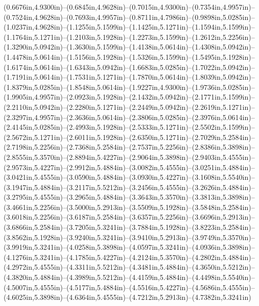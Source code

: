 (0.6676in,4.9300in)--(0.6845in,4.9628in)--(0.7015in,4.9300in)--(0.7354in,4.9957in)--(0.7524in,4.9628in)--(0.7693in,4.9957in)--(0.8711in,4.7986in)--(0.9898in,5.0285in)--(1.0237in,4.9628in)--(1.1255in,5.1599in)--(1.1425in,5.1271in)--(1.1594in,5.1599in)--(1.1764in,5.1271in)--(1.2103in,5.1928in)--(1.2273in,5.1599in)--(1.2612in,5.2256in)--(1.3290in,5.0942in)--(1.3630in,5.1599in)--(1.4138in,5.0614in)--(1.4308in,5.0942in)--(1.4478in,5.0614in)--(1.5156in,5.1928in)--(1.5326in,5.1599in)--(1.5495in,5.1928in)--(1.6174in,5.0614in)--(1.6343in,5.0942in)--(1.6683in,5.0285in)--(1.7022in,5.0942in)--(1.7191in,5.0614in)--(1.7531in,5.1271in)--(1.7870in,5.0614in)--(1.8039in,5.0942in)--(1.8379in,5.0285in)--(1.8548in,5.0614in)--(1.9227in,4.9300in)--(1.9736in,5.0285in)--(1.9905in,4.9957in)--(2.0923in,5.1928in)--(2.1432in,5.0942in)--(2.1771in,5.1599in)--(2.2110in,5.0942in)--(2.2280in,5.1271in)--(2.2449in,5.0942in)--(2.2619in,5.1271in)--(2.3297in,4.9957in)--(2.3636in,5.0614in)--(2.3806in,5.0285in)--(2.3976in,5.0614in)--(2.4145in,5.0285in)--(2.4993in,5.1928in)--(2.5333in,5.1271in)--(2.5502in,5.1599in)--(2.5672in,5.1271in)--(2.6011in,5.1928in)--(2.6350in,5.1271in)--(2.7029in,5.2584in)--(2.7198in,5.2256in)--(2.7368in,5.2584in)--(2.7537in,5.2256in)--(2.8386in,5.3898in)--(2.8555in,5.3570in)--(2.8894in,5.4227in)--(2.9064in,5.3898in)--(2.9403in,5.4555in)--(2.9573in,5.4227in)--(2.9912in,5.4884in)--(3.0082in,5.4555in)--(3.0251in,5.4884in)--(3.0421in,5.4555in)--(3.0590in,5.4884in)--(3.0930in,5.4227in)--(3.1608in,5.5540in)--(3.1947in,5.4884in)--(3.2117in,5.5212in)--(3.2456in,5.4555in)--(3.2626in,5.4884in)--(3.2795in,5.4555in)--(3.2965in,5.4884in)--(3.3643in,5.3570in)--(3.3813in,5.3898in)--(3.4661in,5.2256in)--(3.5000in,5.2913in)--(3.5509in,5.1928in)--(3.5848in,5.2584in)--(3.6018in,5.2256in)--(3.6187in,5.2584in)--(3.6357in,5.2256in)--(3.6696in,5.2913in)--(3.6866in,5.2584in)--(3.7205in,5.3241in)--(3.7884in,5.1928in)--(3.8223in,5.2584in)--(3.8562in,5.1928in)--(3.9240in,5.3241in)--(3.9410in,5.2913in)--(3.9749in,5.3570in)--(3.9919in,5.3241in)--(4.0258in,5.3898in)--(4.0597in,5.3241in)--(4.0936in,5.3898in)--(4.1276in,5.3241in)--(4.1785in,5.4227in)--(4.2124in,5.3570in)--(4.2802in,5.4884in)--(4.2972in,5.4555in)--(4.3311in,5.5212in)--(4.3481in,5.4884in)--(4.3650in,5.5212in)--(4.3820in,5.4884in)--(4.3989in,5.5212in)--(4.4159in,5.4884in)--(4.4498in,5.5540in)--(4.5007in,5.4555in)--(4.5177in,5.4884in)--(4.5516in,5.4227in)--(4.5686in,5.4555in)--(4.6025in,5.3898in)--(4.6364in,5.4555in)--(4.7212in,5.2913in)--(4.7382in,5.3241in) 